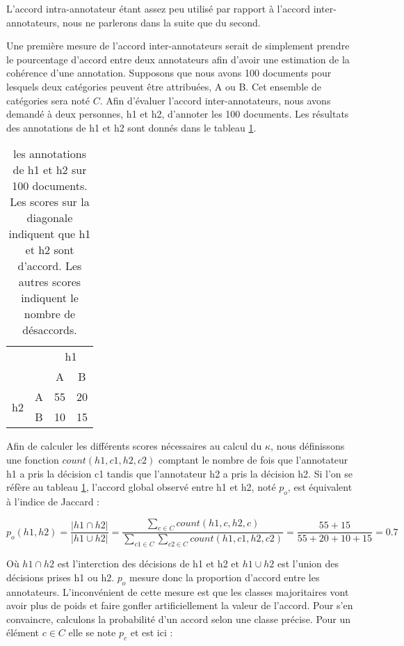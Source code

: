 \documentclass[PhD-Yoann-Dupont.tex]{subfiles}
\begin{document}
L'accord intra-annotateur étant assez peu utilisé par rapport à l'accord inter-annotateurs, nous ne parlerons dans la suite que du second.

Une première mesure de l'accord inter-annotateurs serait de simplement prendre le pourcentage d'accord entre deux annotateurs afin d'avoir une estimation de la cohérence d'une annotation. Supposons que nous avons 100 documents pour lesquels deux catégories peuvent être attribuées, A ou B. Cet ensemble de catégories sera noté $C$. Afin d'évaluer l'accord inter-annotateurs, nous avons demandé à deux personnes, h1 et h2, d'annoter les 100 documents. Les résultats des annotations de h1 et h2 sont donnés dans le tableau \ref{tab:h1-h2-annotations}.

\begin{table}[ht!]
\centering
\begin{tabular}{|cc|cc|}
\cline{3-4}
\multicolumn{2}{c|}{}     & \multicolumn{2}{c|}{h1} \\
\multicolumn{2}{c|}{}     & A  & B \\
\hline
\multirow{2}{*}{h2}   & A & 55 & 20 \\
                      & B & 10 & 15 \\
\hline
\end{tabular}
\caption{les annotations de h1 et h2 sur 100 documents. Les scores sur la diagonale indiquent que h1 et h2 sont d'accord. Les autres scores indiquent le nombre de désaccords.}
\label{tab:h1-h2-annotations}
\end{table}

Afin de calculer les différents scores nécessaires au calcul du $\kappa$, nous définissons une fonction $count(h1,c1,h2,c2)$ comptant le nombre de fois que l'annotateur h1 a pris la décision c1 tandis que l'annotateur h2 a pris la décision h2. Si l'on se réfère au tableau \ref{tab:h1-h2-annotations}, l'accord global observé entre h1 et h2, noté $p_{o}$, est équivalent à l'indice de Jaccard :

\begin{equation}\label{eq:h1-h2-raw-agreement}
p_{o}(h1,h2) = \frac{|h1 \cap h2|}{|h1 \cup h2|} = \frac{\sum_{c \in C} count(h1,c,h2,c)}{\sum_{c1 \in C} \sum_{c2 \in C} count(h1,c1,h2,c2)} = \frac{55 + 15}{55 + 20 + 10 + 15} = 0.7
\end{equation}

Où $h1 \cap h2$ est l'interction des décisions de h1 et h2 et $h1 \cup h2$ est l'union des décisions prises h1 ou h2. $p_{o}$ mesure donc la proportion d'accord entre les annotateurs. L'inconvénient de cette mesure est que les classes majoritaires vont avoir plus de poids et faire gonfler artificiellement la valeur de l'accord. Pour s'en convaincre, calculons la probabilité d'un accord selon une classe précise. Pour un élément $c \in C$ elle se note $p_{c}$ et est ici :
\end{document}
